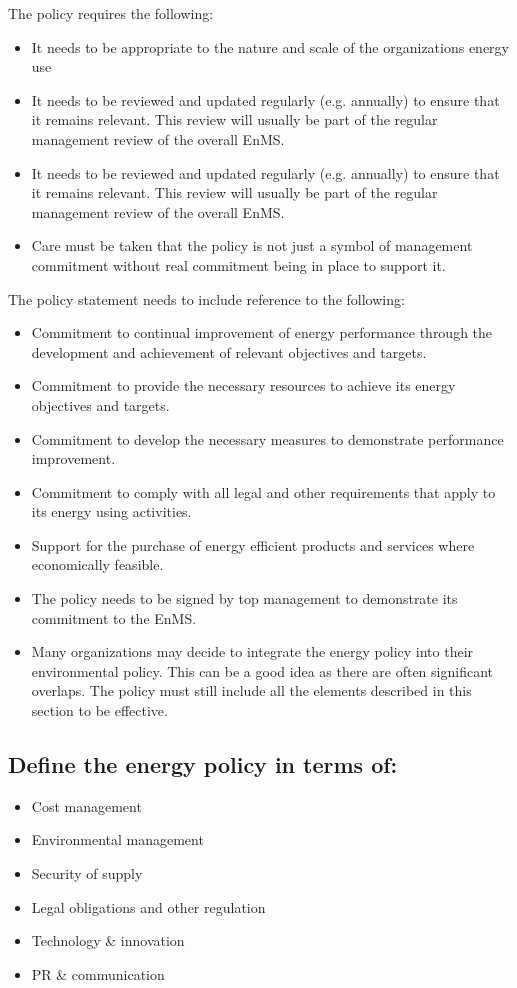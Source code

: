 \documentclass[12pt]{article}
\begin{document}
The policy requires the following:\begin{itemize}
    \item It needs to be appropriate to the nature and scale of the organizations energy use
    \item It needs to be reviewed and updated regularly (e.g. annually) to ensure that it remains relevant. This review will usually be part of the regular management review of the overall EnMS. 
    \item It needs to be reviewed and updated regularly (e.g. annually) to ensure that it remains relevant. This review will usually be part of the regular management review of the overall EnMS.
    \item[] Care must be taken that the policy is not just a symbol of management commitment without real commitment being in place to support it.
\end{itemize}
The policy statement needs to include reference to the following:\begin{itemize}
    \item Commitment to continual improvement of energy performance through the development and
    achievement of relevant objectives and targets.
    \item Commitment to provide the necessary resources to achieve its energy objectives and targets.  
    \item Commitment to develop the necessary measures to demonstrate performance improvement. 
    \item Commitment to comply with all legal and other requirements that apply to its energy using activities. 
    \item Support for the purchase of energy efficient products and services where economically feasible.
    \item[] The policy needs to be signed by top management to demonstrate its commitment to the EnMS. 
    \item[] Many organizations may decide to integrate the energy policy into their environmental policy. This can be a good idea as there are often significant overlaps. The policy must still include all the elements described in this section to be effective.
\end{itemize}
\subsection{Define the energy policy in terms of:}
\begin{itemize}
    \item Cost management 
    \item Environmental management 
    \item Security of supply 
    \item Legal obligations and other regulation 
    \item Technology \& innovation 
    \item PR \& communication
\end{itemize}
\end{document}
